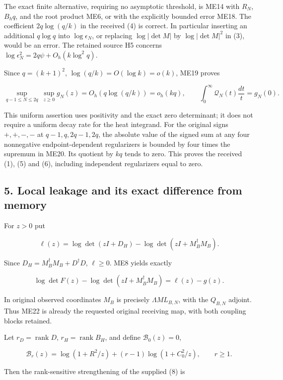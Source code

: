 \documentclass[11pt]{article}
\begin{document}
The exact finite alternative, requiring no asymptotic threshold, is ME14 with \(R_N\), \(B_hq\), and the root product ME6, or with the explicitly bounded error ME18. The coefficient \(2q\log(q/k)\) in the received (4) is correct. In particular inserting an additional \(q\log q\) into \(\log\epsilon_N\), or replacing \(\log|\det M|\) by \(\log|\det M|^2\) in (3), would be an error. The retained source H5 concerns \(\log\epsilon_N^2=2q\psi+O_h(k\log^2 q)\).

Since \(q=(k+1)^2\), \(\log(q/k)=O(\log k)=o(k)\), ME19 proves

\[
\boxed{\sup_{q-1\le N\le2q}\ \sup_{z\ge0}g_N(z)
=O_h(q\log(q/k))=o_h(kq),\qquad
\int_0^\infty\mathcal Q_N(t)\frac{dt}{t}=g_N(0).}
\tag{ME20}
\]

This uniform assertion uses positivity and the exact zero determinant; it does not require a uniform decay rate for the heat integrand. For the original signs \(+,+,-,-\) at \(q-1,q,2q-1,2q\), the absolute value of the signed sum at any four nonnegative endpoint-dependent regularizers is bounded by four times the supremum in ME20. Its quotient by \(kq\) tends to zero. This proves the received (1), (5) and (6), including independent regularizers equal to zero.

\subsection{5. Local leakage and its exact difference from memory}\label{local-leakage-and-its-exact-difference-from-memory}

For \(z>0\) put

\[
\ell(z)=\log\det(zI+D_H)-\log\det(zI+M_B^\dagger M_B).
\tag{ME21}
\]

Since \(D_H=M_B^\dagger M_B+D^\dagger D\), \(\ell\ge0\). ME8 yields exactly

\[
\boxed{\log\det F(z)-\log\det(zI+M_B^\dagger M_B)=\ell(z)-g(z).}
\tag{ME22}
\]

In original observed coordinates \(M_B\) is precisely \(\Lambda ML_{B,N}\), with the \(Q_{B,N}\) adjoint. Thus ME22 is already the requested original receiving map, with both coupling blocks retained.

Let \(r_D=\operatorname{rank}D\), \(r_H=\operatorname{rank}B_H\), and define \(\mathcal B_0(z)=0\),

\[
\mathcal B_r(z)=\log(1+R^2/z)+(r-1)\log(1+C_0^2/z),\qquad r\ge1.
\tag{ME23}
\]

Then the rank-sensitive strengthening of the supplied (8) is
\end{document}
